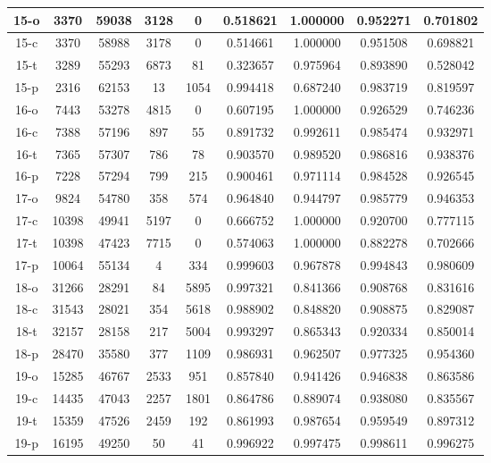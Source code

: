 \begin{longtable}[!h]{|c|c|c|c|c|c|c|c|c|}
	\hline	15-o	&	3370	&	59038	&	3128	&	0	&	0.518621	&	1.000000	&	0.952271	&	0.701802	\\
	\hline	15-c	&	3370	&	58988	&	3178	&	0	&	0.514661	&	1.000000	&	0.951508	&	0.698821	\\
	\hline	\rowcolor{bad} 15-t	&	3289	&	55293	&	6873	&	81	&	0.323657	&	0.975964	&	0.893890	&	0.528042	\\
	\hline	\rowcolor{closest} 15-p	&	2316	&	62153	&	13	&	1054	&	0.994418	&	0.687240	&	0.983719	&	0.819597	\\

	\hline	\rowcolor{bad} 16-o	&	7443	&	53278	&	4815	&	0	&	0.607195	&	1.000000	&	0.926529	&	0.746236	\\
	\hline	16-c	&	7388	&	57196	&	897	&	55	&	0.891732	&	0.992611	&	0.985474	&	0.932971	\\
	\hline	\rowcolor{closest} 16-t	&	7365	&	57307	&	786	&	78	&	0.903570	&	0.989520	&	0.986816	&	0.938376	\\
	\hline	16-p	&	7228	&	57294	&	799	&	215	&	0.900461	&	0.971114	&	0.984528	&	0.926545	\\

	\hline	17-o	&	9824	&	54780	&	358	&	574	&	0.964840	&	0.944797	&	0.985779	&	0.946353	\\
	\hline	17-c	&	10398	&	49941	&	5197	&	0	&	0.666752	&	1.000000	&	0.920700	&	0.777115	\\
	\hline	\rowcolor{bad} 17-t	&	10398	&	47423	&	7715	&	0	&	0.574063	&	1.000000	&	0.882278	&	0.702666	\\
	\hline	\rowcolor{closest} 17-p	&	10064	&	55134	&	4	&	334	&	0.999603	&	0.967878	&	0.994843	&	0.980609	\\

	\hline	\rowcolor{bad} 18-o	&	31266	&	28291	&	84	&	5895	&	0.997321	&	0.841366	&	0.908768	&	0.831616	\\
	\hline	18-c	&	31543	&	28021	&	354	&	5618	&	0.988902	&	0.848820	&	0.908875	&	0.829087	\\
	\hline	18-t	&	32157	&	28158	&	217	&	5004	&	0.993297	&	0.865343	&	0.920334	&	0.850014	\\
	\hline	\rowcolor{closest} 18-p	&	28470	&	35580	&	377	&	1109	&	0.986931	&	0.962507	&	0.977325	&	0.954360	\\

	\hline	19-o	&	15285	&	46767	&	2533	&	951	&	0.857840	&	0.941426	&	0.946838	&	0.863586	\\
	\hline	\rowcolor{bad} 19-c	&	14435	&	47043	&	2257	&	1801	&	0.864786	&	0.889074	&	0.938080	&	0.835567	\\
	\hline	19-t	&	15359	&	47526	&	2459	&	192	&	0.861993	&	0.987654	&	0.959549	&	0.897312	\\
	\hline	\rowcolor{closest} 19-p	&	16195	&	49250	&	50	&	41	&	0.996922	&	0.997475	&	0.998611	&	0.996275	\\


\end{longtable}
